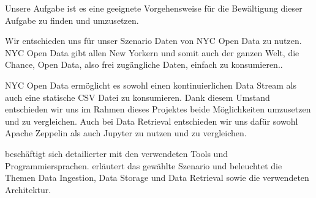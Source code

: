 Unsere Aufgabe ist es eine geeignete Vorgehensweise für die Bewältigung dieser Aufgabe zu finden und umzusetzen.

Wir entschieden uns für unser Szenario Daten von NYC Open Data zu nutzen.
NYC Open Data gibt allen \glqq New Yorkern\grqq{} und somit auch der ganzen Welt, die Chance, Open Data, also frei zugängliche Daten,
einfach zu konsumieren.\autocite{NYCOpenData}.

NYC Open Data ermöglicht es sowohl einen kontinuierlichen Data Stream als auch eine statische \ac{CSV} Datei zu konsumieren.
Dank diesem Umstand entschieden wir uns im Rahmen dieses Projektes beide Möglichkeiten umzusetzen und zu vergleichen.
Auch bei Data Retrieval entschieden wir uns dafür sowohl Apache Zeppelin als auch Jupyter zu nutzen und zu vergleichen.

 beschäftigt sich detailierter mit den verwendeten Tools und Programmiersprachen.
 erläutert das gewählte Szenario und beleuchtet die Themen Data Ingestion, Data Storage und Data Retrieval sowie die verwendeten Architektur.
